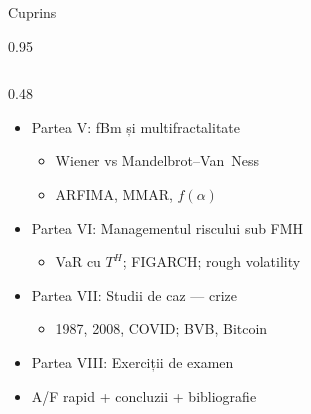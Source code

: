 \documentclass[9pt, aspectratio=169, t]{beamer}
\begin{document}
\begin{frame}[shrink=15]{Cuprins}
\begin{cminipage}{0.95\textwidth}
\begin{columns}[T]
\begin{column}{0.48\textwidth}
\begin{itemize}\setlength{\itemsep}{0pt}
    \item Partea V: fBm și multifractalitate
    \begin{itemize}\setlength{\itemsep}{0pt}
        \item Wiener vs Mandelbrot--Van~Ness
        \item ARFIMA, MMAR, $f(\alpha)$
    \end{itemize}
    \item Partea VI: Managementul riscului sub FMH
    \begin{itemize}\setlength{\itemsep}{0pt}
        \item VaR cu $T^H$; FIGARCH; rough volatility
    \end{itemize}
    \item Partea VII: Studii de caz --- crize
    \begin{itemize}\setlength{\itemsep}{0pt}
        \item 1987, 2008, COVID; BVB, Bitcoin
    \end{itemize}
    \item Partea VIII: Exerciții de examen
    \item A/F rapid + concluzii + bibliografie
\end{itemize}
\end{column}
\end{columns}
\end{cminipage}
\end{frame}
\end{document}
